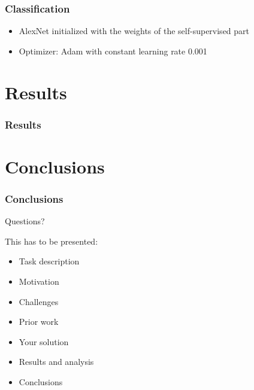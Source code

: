 \documentclass{beamer}
\begin{document}
\begin{frame}
\frametitle{Classification}
\begin{itemize}
 \item AlexNet initialized with the weights of the self-supervised part
 \item Optimizer: Adam with constant learning rate 0.001
\end{itemize}
\end{frame}

\section{Results}
\begin{frame}
\frametitle{Results}

\end{frame}

\section{Conclusions}
\begin{frame}
\frametitle{Conclusions}

\end{frame}



\begin{frame}[plain]
\begin{center}
\LARGE Questions?
\end{center}
\end{frame}

\begin{frame}
This has to be presented:
\begin{itemize}
 \item Task description
 \item Motivation
 \item Challenges
 \item Prior work
 \item Your solution
 \item Results and analysis
 \item Conclusions
\end{itemize}
\end{frame}
\end{document}
